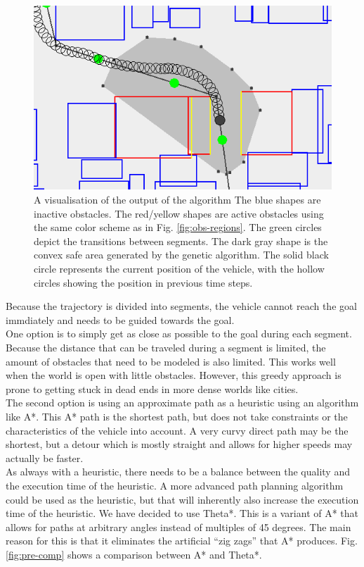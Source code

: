 \begin{figure}[!t]
    \centering
        \includegraphics[width=0.8\columnwidth]{img/pre-full}
    \caption{A visualisation of the output of the algorithm The blue shapes are inactive obstacles. The red/yellow shapes are active obstacles using the same color scheme as in Fig. \ref{fig:obs-regions}. The green circles depict the transitions between segments. The dark gray shape is the convex safe area generated by the genetic algorithm. The solid black circle represents the current position of the vehicle, with the hollow circles showing the position in previous time steps.}\label{fig:pre-full}
\end{figure}
Because the trajectory is divided into segments, the vehicle cannot reach the goal immdiately and needs to be guided towards the goal.\\
One option is to simply get as close as possible to the goal during each segment. Because the distance that can be traveled during a segment is limited, the amount of obstacles that need to be modeled is also limited. This works well when the world is open with little obstacles. However, this greedy approach is prone to getting stuck in dead ends in more dense worlds like cities.\\
The second option is using an approximate path as a heuristic using an algorithm like A*. This A* path is the shortest path, but does not take constraints or the characteristics of the vehicle into account. A very curvy direct path may be the shortest, but a detour which is mostly straight and allows for higher speeds may actually be faster. \\
As always with a heuristic, there needs to be a balance between the quality and the execution time of the heuristic. A more advanced path planning algorithm could be used as the heuristic, but that will inherently also increase the execution time of the heuristic. We have decided to use Theta*\cite{Daniel2010}. This is a variant  of A* that allows for paths at arbitrary angles instead of multiples of 45 degrees. The main reason for this is that it eliminates the artificial ``zig zags'' that A* produces. Fig. \ref{fig:pre-comp} shows a comparison between A* and Theta*.
